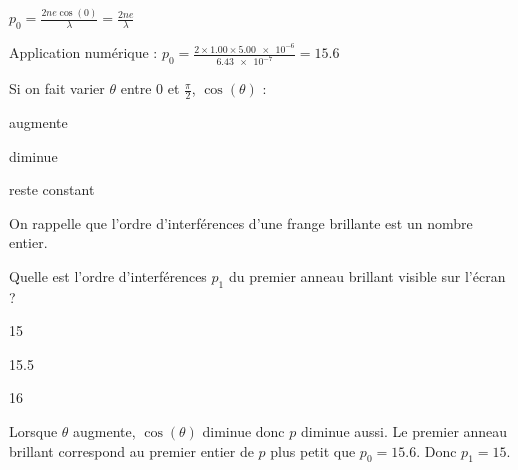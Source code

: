 	
\begin{corrige}
	$p_0=\frac{2ne \cos(0)}{\lambda}=\frac{2ne}{\lambda}$

	Application numérique : $p_0=\frac{2 \times \num{1.00} \times \num{5.00e-6}}{\num{6.43e-7}}=\num{15.6}$
\end{corrige}
	


\begin{enonce}
Si on fait varier $\theta$ entre $\num{0}$ et $\frac{\pi}{2}$, $\cos(\theta)$ :
\begin{listeQCM3Colonnes}
	\item augmente
	\item diminue
	\item reste constant
\end{listeQCM3Colonnes}
\bigskip
\end{enonce}
			
\reponse{\reponseB{}}
			
			


\begin{enonce}
On rappelle que l'ordre d'interférences d'une frange brillante est un nombre entier.

Quelle est l'ordre d'interférences $p_1$ du premier anneau brillant visible sur l'écran ?
\begin{listeQCM3Colonnes}
	\item 15
	\item 15.5
	\item 16
\end{listeQCM3Colonnes}
\end{enonce}
		
\reponse{\reponseA{}}
		
\begin{corrige}
	Lorsque $\theta$ augmente, $\cos(\theta)$ diminue donc $p$ diminue aussi. Le premier anneau brillant correspond au premier entier de $p$ plus petit que $p_0=\num{15.6}$. Donc $p_1=\num{15}$.
\end{corrige}
		
